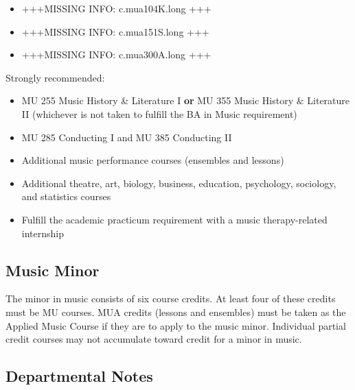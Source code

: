 \documentclass[
  letterpaper,
]{scrbook}
\providecommand{\tightlist}{%
  \setlength{\itemsep}{0pt}\setlength{\parskip}{0pt}}
\begin{document}
\begin{enumerate}
\begin{itemize}
    \begin{itemize}
    \tightlist
    \item
      +++MISSING INFO: c.mua104K.long +++
    \item
      +++MISSING INFO: c.mua151S.long +++
    \item
      +++MISSING INFO: c.mua300A.long +++
    \end{itemize}
  \end{itemize}
\end{enumerate}

Strongly recommended:

\begin{itemize}
\tightlist
\item
  MU 255 Music History \& Literature I \textbf{or} MU 355 Music History
  \& Literature II (whichever is not taken to fulfill the BA in Music
  requirement)
\item
  MU 285 Conducting I and MU 385 Conducting II
\item
  Additional music performance courses (ensembles and lessons)
\item
  Additional theatre, art, biology, business, education, psychology,
  sociology, and statistics courses
\item
  Fulfill the academic practicum requirement with a music
  therapy-related internship
\end{itemize}

\subsection{Music Minor}\label{music-minor}

The minor in music consists of six course credits. At least four of
these credits must be MU courses. MUA credits (lessons and ensembles)
must be taken as the Applied Music Course if they are to apply to the
music minor. Individual partial credit courses may not accumulate toward
credit for a minor in music.

\subsection{Departmental Notes}\label{departmental-notes}
\end{document}
